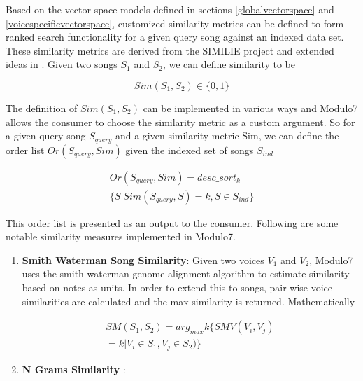 \documentclass{article}
\begin{document}
Based on the vector space models defined in sections \ref{globalvectorspace} and
\ref{voicespecificvectorspace}, customized similarity metrics can be defined to form ranked search functionality for a given query song against an indexed data set. These similarity metrics are derived from the SIMILIE project \cite{similie} and extended ideas in \cite{smithwatermanmusic}. Given two songs $S_1$ and $S_2$, we can define similarity to be 

\begin{equation}
Sim(S_1, S_2) \in \{0, 1\}
\end{equation}

\noindent The definition of $Sim(S_1, S_2)$ can be implemented in various ways and Modulo7 allows the consumer to choose the similarity metric as a custom argument. So for a given query song $S_{query}$ and a given similarity metric Sim, we can define the order list $Or(S_{query}, Sim)$ given the indexed set of songs $S_{ind}$

\begin{equation}
\begin{aligned}
Or(S_{query}, Sim) =  desc\_sort_k \\ \{S | Sim(S_{query}, S) = k, S \in S_{ind}\}
\end{aligned}
\end{equation}

\noindent This order list is presented as an output to the consumer. Following are some notable similarity measures implemented in Modulo7. 

\begin{enumerate}
\item \textbf{Smith Waterman Song Similarity}: Given two voices $V_1$ and $V_2$, Modulo7 uses the smith waterman genome alignment algorithm \cite{smithwatermanmusic} to estimate similarity based on notes as units. In order to extend this to songs, pair wise voice similarities are calculated and the max similarity is returned. Mathematically 

\begin{equation}
\begin{aligned}
SM(S_1, S_2) = arg_{max} k \{SMV(V_i, V_j) \\ = k | V_i \in S_1, V_j \in S_2)\}
\end{aligned}
\end{equation} 

\item \textbf{N Grams Similarity }: 
\end{enumerate}
\end{document}
